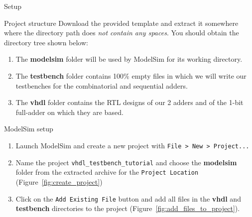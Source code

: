 \documentclass[lab]{course}
\begin{document}
\begin{section}{Setup}
    \begin{subsection}{Project structure}
        Download the provided template and extract it somewhere where the directory path does \emph{not contain any spaces}. You should obtain the directory tree shown below: \\


        \begin{enumerate}
            \item The \textbf{modelsim} folder will be used by ModelSim for its working directory.
            \item The \textbf{testbench} folder contains 100\% empty files in which we will write our testbenches for the combinatorial and sequential adders.
            \item The \textbf{vhdl} folder contains the RTL designs of our 2 adders and of the 1-bit full-adder on which they are based.
        \end{enumerate}
    \end{subsection}

    \begin{subsection}{ModelSim setup}
        \begin{enumerate}
            \item Launch ModelSim and create a new project with \verb+File > New > Project...+

            \item Name the project \verb+vhdl_testbench_tutorial+ and choose the \textbf{modelsim} folder from the extracted archive for the \verb+Project Location+ (Figure~\ref{fig:create_project})

            \item Click on the \verb+Add Existing File+ button and add all files in the \textbf{vhdl} and \textbf{testbench} directories to the project (Figure~\ref{fig:add_files_to_project}).


\end{enumerate}
\end{subsection}
\end{section}
\end{document}
